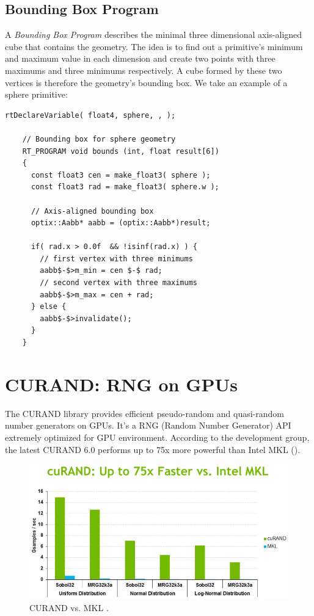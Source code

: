 \subsection{Bounding Box Program}
A \textit{Bounding Box Program} describes the minimal three dimensional axis-aligned cube that contains the geometry. The idea is to find out a primitive's minimum and maximum value in each dimension and create two points with three maximums and three minimums respectively. A cube formed by these two vertices is therefore the geometry's bounding box. We take an example of a sphere primitive:
\begin{lstlisting}[mathescape]
    rtDeclareVariable( float4, sphere, , );
    
    // Bounding box for sphere geometry
    RT_PROGRAM void bounds (int, float result[6])
    {
      const float3 cen = make_float3( sphere );
      const float3 rad = make_float3( sphere.w );

      // Axis-aligned bounding box
      optix::Aabb* aabb = (optix::Aabb*)result;
  
      if( rad.x > 0.0f  && !isinf(rad.x) ) {
        // first vertex with three minimums
        aabb$-$>m_min = cen $-$ rad;
        // second vertex with three maximums
        aabb$-$>m_max = cen + rad;
      } else {
        aabb$-$>invalidate();
      }
    }
\end{lstlisting}

\section{CURAND: RNG on GPUs }
The CURAND library provides efficient pseudo-random and quasi-random number generators on GPUs. It's a RNG (Random Number Generator) API extremely optimized for GPU environment. According to the development group, the latest CURAND 6.0 performs up to 75x more powerful than Intel MKL \citep{cuda6report} ().
\begin{figure}[htbp]
	\centering
		\includegraphics[width=13cm]{Figures/curand1.png}
	\caption[CURAND vs. MKL]{CURAND vs. MKL \citep{cuda6report}.}%
	\label{fig:curandmkl}
\end{figure}

